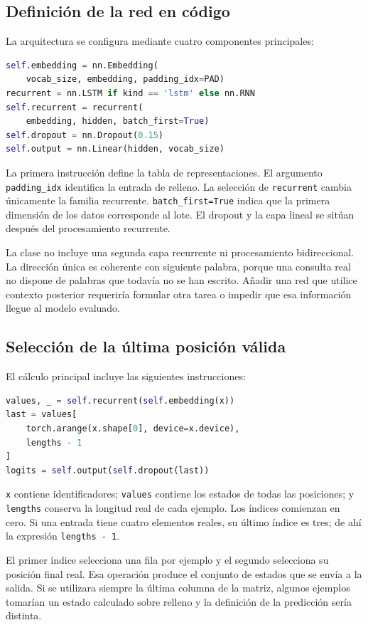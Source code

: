 \subsection{Definición de la red en código}
La arquitectura se configura mediante cuatro componentes principales:
\begin{lstlisting}[language=Python]
self.embedding = nn.Embedding(
    vocab_size, embedding, padding_idx=PAD)
recurrent = nn.LSTM if kind == 'lstm' else nn.RNN
self.recurrent = recurrent(
    embedding, hidden, batch_first=True)
self.dropout = nn.Dropout(0.15)
self.output = nn.Linear(hidden, vocab_size)
\end{lstlisting}
La primera instrucción define la tabla de representaciones. El argumento \texttt{padding\_idx} identifica la entrada de relleno. La selección de \texttt{recurrent} cambia únicamente la familia recurrente. \texttt{batch\_first=True} indica que la primera dimensión de los datos corresponde al lote. El dropout y la capa lineal se sitúan después del procesamiento recurrente.

La clase no incluye una segunda capa recurrente ni procesamiento bidireccional. La dirección única es coherente con siguiente palabra, porque una consulta real no dispone de palabras que todavía no se han escrito. Añadir una red que utilice contexto posterior requeriría formular otra tarea o impedir que esa información llegue al modelo evaluado.

\subsection{Selección de la última posición válida}
El cálculo principal incluye las siguientes instrucciones:
\begin{lstlisting}[language=Python]
values, _ = self.recurrent(self.embedding(x))
last = values[
    torch.arange(x.shape[0], device=x.device),
    lengths - 1
]
logits = self.output(self.dropout(last))
\end{lstlisting}
\texttt{x} contiene identificadores; \texttt{values} contiene los estados de todas las posiciones; y \texttt{lengths} conserva la longitud real de cada ejemplo. Los índices comienzan en cero. Si una entrada tiene cuatro elementos reales, su último índice es tres; de ahí la expresión \texttt{lengths - 1}.

El primer índice selecciona una fila por ejemplo y el segundo selecciona su posición final real. Esa operación produce el conjunto de estados que se envía a la salida. Si se utilizara siempre la última columna de la matriz, algunos ejemplos tomarían un estado calculado sobre relleno y la definición de la predicción sería distinta.

